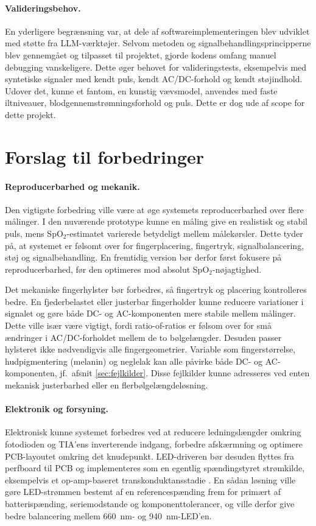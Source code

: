 \paragraph{Valideringsbehov.}
En yderligere begrænsning var, at dele af softwareimplementeringen blev udviklet med støtte fra LLM-værktøjer. Selvom metoden og signalbehandlingsprincipperne blev gennemgået og tilpasset til projektet, gjorde kodens omfang manuel debugging vanskeligere. Dette øger behovet for valideringstests, eksempelvis med syntetiske signaler med kendt puls, kendt AC/DC-forhold og kendt støjindhold. Udover det, kunne et fantom, en kunstig vævsmodel, anvendes med faste iltniveauer, blodgennemstrømningsforhold og puls. Dette er dog ude af scope for dette projekt.

\section{Forslag til forbedringer}
\paragraph{Reproducerbarhed og mekanik.}
Den vigtigste forbedring ville være at øge systemets reproducerbarhed over flere målinger. I den nuværende prototype kunne en måling give en realistisk og stabil puls, mens SpO$_2$-estimatet varierede betydeligt mellem målekørsler. Dette tyder på, at systemet er følsomt over for fingerplacering, fingertryk, signalbalancering, støj og signalbehandling. En fremtidig version bør derfor først fokusere på reproducerbarhed, før den optimeres mod absolut SpO$_2$-nøjagtighed.

Det mekaniske fingerhylster bør forbedres, så fingertryk og placering kontrolleres bedre. En fjederbelastet eller justerbar fingerholder kunne reducere variationer i signalet og gøre både DC- og AC-komponenten mere stabile mellem målinger. Dette ville især være vigtigt, fordi ratio-of-ratios er følsom over for små ændringer i AC/DC-forholdet mellem de to bølgelængder. Desuden passer hylsteret ikke nødvendigvis alle fingergeometrier. Variable som fingerstørrelse, hudpigmentering (melanin) og neglelak kan alle påvirke både DC- og AC-komponenten, jf.\ afsnit \ref{sec:fejlkilder}. Disse fejlkilder kunne adresseres ved enten mekanisk justerbarhed eller en flerbølgelængdeløsning.

\paragraph{Elektronik og forsyning.}
Elektronisk kunne systemet forbedres ved at reducere ledningslængder omkring fotodioden og TIA'ens inverterende indgang, forbedre afskærmning og optimere PCB-layoutet omkring det knudepunkt. LED-driveren bør desuden flyttes fra perfboard til PCB og implementeres som en egentlig spændingstyret strømkilde, eksempelvis et op-amp-baseret transkonduktansstadie \cite{Ramus2013}. En sådan løsning ville gøre LED-strømmen bestemt af en referencespænding frem for primært af batterispænding, seriemodstande og komponenttolerancer, og ville derfor give bedre balancering mellem \SI{660}{nm}- og \SI{940}{nm}-LED'en.

